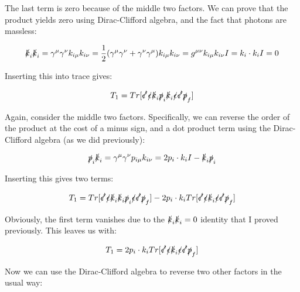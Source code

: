 \documentclass[a4]{article}
\begin{document}
    The last term is zero because of the middle two factors. We can prove that the product yields zero using Dirac-Clifford algebra, and the fact that photons are massless:

    \begin{equation}
        \slashed{k}_i \slashed{k}_i = \gamma^\mu \gamma^\nu k_{i \mu} k_{i \nu} = \frac{1}{2} (\gamma^\mu \gamma^\nu + \gamma^\nu \gamma^\mu) k_{i \mu} k_{i \nu} = g^{\mu \nu} k_{i \mu} k_{i \nu} I = k_i \cdot k_i I = 0
    \end{equation}

    Inserting this into trace gives:

    \begin{equation}
        T_1 = Tr [\slashed{\epsilon'} \slashed{\epsilon} \slashed{k}_i \slashed{p}_i \slashed{k}_i \slashed{\epsilon} \slashed{\epsilon'} \slashed{p}_f]
    \end{equation}

    Again, consider the middle two factors. Specifically, we can reverse the order of the product at the cost of a minus sign, and a dot product term using the Dirac-Clifford algebra
    (as we did previously):

    \begin{equation}
        \slashed{p}_i \slashed{k}_i = \gamma^{\mu} \gamma^{\nu} p_{i \mu} k_{i \nu} = 2 p_i \cdot k_i I - \slashed{k}_i \slashed{p}_i
    \end{equation}

    Inserting this gives two terms:

    \begin{equation}
        T_1 = Tr [\slashed{\epsilon'} \slashed{\epsilon} \slashed{k}_i \slashed{k}_i \slashed{p}_i \slashed{\epsilon} \slashed{\epsilon'} \slashed{p}_f] - 2 p_i \cdot k_i Tr [\slashed{\epsilon'} \slashed{\epsilon} \slashed{k}_i \slashed{\epsilon} \slashed{\epsilon'} \slashed{p}_f]
    \end{equation}

    Obviously, the first term vanishes due to the $\slashed{k}_i \slashed{k}_i = 0$ identity that I proved previously. This leaves us with:

    \begin{equation}
        T_1 = 2 p_i \cdot k_i Tr[\slashed{\epsilon'} \slashed{\epsilon} \slashed{k}_i \slashed{\epsilon} \slashed{\epsilon'} \slashed{p}_f]
    \end{equation}

    Now we can use the Dirac-Clifford algebra to reverse two other factors in the usual way:
\end{document}
